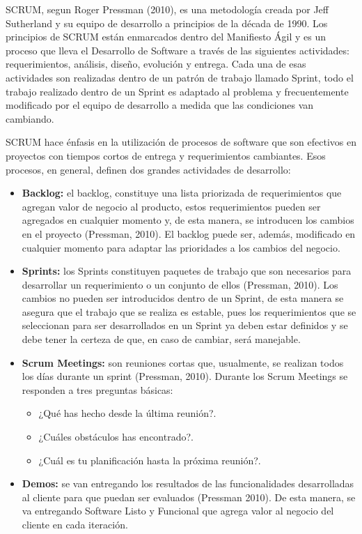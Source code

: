 SCRUM, segun Roger Pressman (2010), es una metodología creada por Jeff Sutherland y su equipo de desarrollo a principios de la década de 1990. Los principios de SCRUM están enmarcados dentro del Manifiesto Ágil y es un proceso que lleva el Desarrollo de Software a través de las siguientes actividades: requerimientos, análisis, diseño, evolución y entrega. Cada una de esas actividades son realizadas dentro de un patrón de trabajo llamado Sprint, todo el trabajo realizado dentro de un Sprint es adaptado al problema y frecuentemente modificado por el equipo de desarrollo a medida que las condiciones van cambiando.

SCRUM hace énfasis en la utilización de procesos de software que son efectivos en proyectos con tiempos cortos de entrega y requerimientos cambiantes. Esos procesos, en general, definen dos grandes actividades de desarrollo:

\begin{itemize}
\item \textbf{Backlog:} el backlog, constituye una lista priorizada de requerimientos que agregan valor de negocio al producto, estos requerimientos pueden ser agregados en cualquier momento y, de esta manera, se introducen los cambios en el proyecto (Pressman, 2010). El backlog puede ser, además, modificado en cualquier momento para adaptar las prioridades a los cambios del negocio.
\item \textbf{Sprints:} los Sprints constituyen paquetes de trabajo que son necesarios para desarrollar un requerimiento o un conjunto de ellos (Pressman, 2010). Los cambios no pueden ser introducidos dentro de un Sprint, de esta manera se asegura que el trabajo que se realiza es estable, pues los requerimientos que se seleccionan para ser desarrollados en un Sprint ya deben estar definidos y se debe tener la certeza de que, en caso de cambiar, será manejable.
\item \textbf{Scrum Meetings:} son reuniones cortas que, usualmente, se realizan todos los días durante un sprint (Pressman, 2010). Durante los Scrum Meetings se responden a tres preguntas básicas:
\begin{itemize}
\item ¿Qué has hecho desde la última reunión?.
\item ¿Cuáles obstáculos has encontrado?.
\item ¿Cuál es tu planificación hasta la próxima reunión?.
\end{itemize}
\item \textbf{Demos:} se van entregando los resultados de las funcionalidades desarrolladas al cliente para que puedan ser evaluados (Pressman 2010). De esta manera, se va entregando Software Listo y Funcional que agrega valor al negocio del cliente en cada iteración.
\end{itemize}

